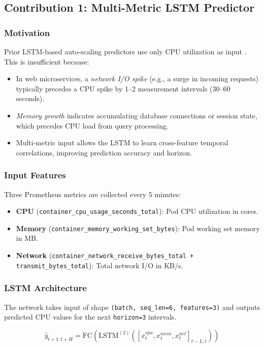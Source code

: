 \documentclass[journal]{IEEEtran}
\begin{document}
\subsection{Contribution 1: Multi-Metric LSTM Predictor}
\label{sec:multimetric}

\subsubsection{Motivation}
Prior LSTM-based auto-scaling predictors use only CPU utilization as input \cite{dangquang2021}. This is insufficient because:
\begin{itemize}
    \item In web microservices, a \textit{network I/O spike} (e.g., a surge in incoming requests) typically precedes a CPU spike by 1--2 measurement intervals (30--60 seconds).
    \item \textit{Memory growth} indicates accumulating database connections or session state, which precedes CPU load from query processing.
    \item Multi-metric input allows the LSTM to learn cross-feature temporal correlations, improving prediction accuracy and horizon.
\end{itemize}

\subsubsection{Input Features}
Three Prometheus metrics are collected every 5 minutes:
\begin{itemize}
    \item \textbf{CPU} (\texttt{container\_cpu\_usage\_seconds\_total}): Pod CPU utilization in cores.
    \item \textbf{Memory} (\texttt{container\_memory\_working\_set\_bytes}): Pod working set memory in MB.
    \item \textbf{Network} (\texttt{container\_network\_receive\_bytes\_total + transmit\_bytes\_total}): Total network I/O in KB/s.
\end{itemize}

\subsubsection{LSTM Architecture}
The network takes input of shape \texttt{(batch, seq\_len=6, features=3)} and outputs predicted CPU values for the next \texttt{horizon=3} intervals.

\begin{equation}
\hat{y}_{t+1:t+H} = \text{FC}\left(\text{LSTM}^{(2)}\left([x^{cpu}_t, x^{mem}_t, x^{net}_t]_{t-L:t}\right)\right)
\label{eq:multiLSTM}
\end{equation}
\end{document}
